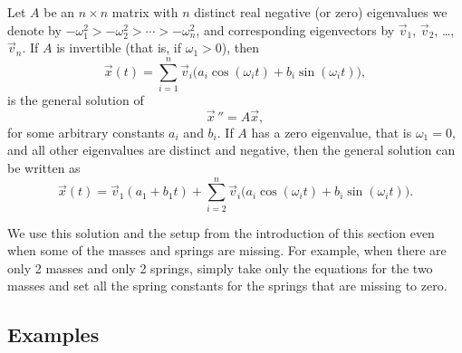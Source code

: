 \documentclass[12pt]{book}
\begin{document}
\begin{theorem}
Let $A$ be an $n \times n$ matrix
with $n$ distinct real negative (or zero) eigenvalues we
denote by $-\omega_1^2 > -\omega_2^2 > \cdots > -\omega_n^2$, and
corresponding
eigenvectors by
$\vec{v}_1$, $\vec{v}_2$, \ldots, $\vec{v}_n$.  If $A$ is invertible
(that is, if $\omega_1 > 0$), then
\begin{equation*}
\boxed{~~
\vec{x}(t)
= \sum_{i=1}^n \vec{v}_i \bigl(a_i \cos (\omega_i t) + b_i \sin (\omega_i t) \bigr) ,
~~}
\end{equation*}
is the general solution of
\begin{equation*}
{\vec{x}\,}'' = A \vec{x},
\end{equation*}
for some arbitrary constants $a_i$ and $b_i$.
If $A$ has a zero eigenvalue, that is $\omega_1 = 0$,
and all other eigenvalues are distinct and
negative, then the general solution can be written as
\begin{equation*}
\boxed{~~
\vec{x}(t) = \vec{v}_1 (a_1 + b_1 t) +
\sum_{i=2}^n \vec{v}_i \bigl(a_i \cos (\omega_i t) + b_i \sin (\omega_i t) \bigr) .
~~}
\end{equation*}
\end{theorem}

We use this solution and the setup from the introduction
of this section even when some of the masses and springs are missing.  
For example, when there are only 2 masses and only 2 springs, simply take
only the equations for
the two masses and set all the spring constants for the springs that
are missing to zero.

\subsection{Examples}
\end{document}
